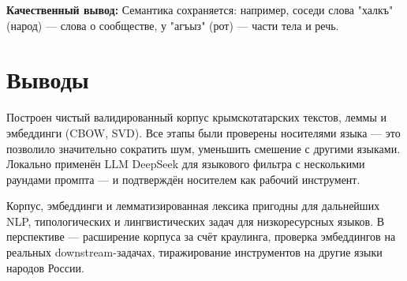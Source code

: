 \documentclass{article}
\begin{document}
\textbf{Качественный вывод:} Семантика сохраняется: например, соседи слова "{}халкъ"{} (народ) — слова о сообществе, у "{}агъыз"{} (рот) — части тела и речь.

\section{Выводы}
Построен чистый валидированный корпус крымскотатарских текстов, леммы и эмбеддинги (CBOW, SVD). Все этапы были проверены носителями языка — это позволило значительно сократить шум, уменьшить смешение с другими языками. Локально применён LLM DeepSeek для языкового фильтра с несколькими раундами промпта — и подтверждён носителем как рабочий инструмент.

Корпус, эмбеддинги и лемматизированная лексика пригодны для дальнейших NLP, типологических и лингвистических задач для низкоресурсных языков. В перспективе — расширение корпуса за счёт краулинга, проверка эмбеддингов на реальных downstream-задачах, тиражирование инструментов на другие языки народов России.



\end{document}
